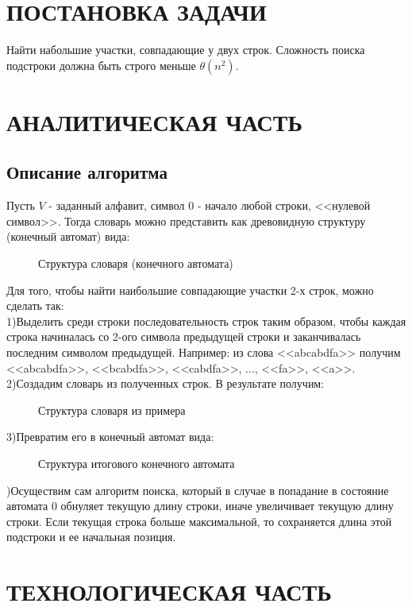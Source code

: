 \documentclass[a4paper,12pt]{article}
\newcommand{\anonsection}[1]{\section*{#1}\addcontentsline{toc}{section}{#1}}
\begin{document}
\tableofcontents


\newpage

\newpage
\anonsection{ПОСТАНОВКА ЗАДАЧИ}
Найти набольшие участки, совпадающие у двух строк. Сложность поиска подстроки должна быть строго меньше $\theta(n^2)$.

\newpage
\section{АНАЛИТИЧЕСКАЯ ЧАСТЬ}
\subsection{Описание алгоритма}
Пусть $V$ - заданный алфавит, символ $0$ - начало любой строки, <<нулевой символ>>. Тогда словарь можно представить как древовидную структуру (конечный автомат) вида: \\
\begin{figure}[H]
\caption{Структура словаря (конечного автомата)}
\label{images:automat1}
\end{figure}

Для того, чтобы найти наибольшие совпадающие участки 2-х строк, можно сделать так:\\
1)Выделить среди строки последовательность строк таким образом, чтобы каждая строка начиналась со 2-ого символа предыдущей строки и заканчивалась последним символом предыдущей. Например: из слова <<abcabdfa>> получим <<abcabdfa>>, <<bcabdfa>>, <<cabdfa>>, ..., <<fa>>, <<a>>.\\
2)Создадим словарь из полученных строк. В результате получим:
\newpage
\begin{figure}[h]
\caption{Структура словаря из примера}
\label{images:automat2}
\end{figure} 
3)Превратим его в конечный автомат вида:
\newpage
\begin{figure}[H]
\caption{Структура итогового конечного автомата}
\label{images:automat3}
\end{figure}
)Осуществим сам алгоритм поиска, который в случае в попадание в состояние автомата 0 обнуляет текущую длину строки, иначе увеличивает текущую длину строки. Если текущая строка больше максимальной, то сохраняется длина этой подстроки и ее начальная позиция.

\newpage
\section{ТЕХНОЛОГИЧЕСКАЯ ЧАСТЬ}
\end{document}
